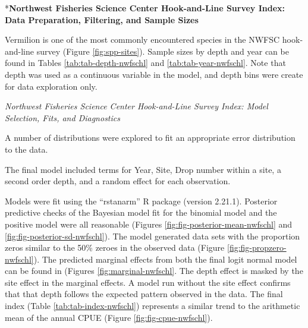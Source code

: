 \documentclass[
  english,
  a4paper,
]{article}
\begin{document}
*\textbf{Northwest Fisheries Science Center Hook-and-Line Survey Index: Data Preparation, Filtering, and Sample Sizes}

Vermilion is one of the most commonly encountered species in the NWFSC hook-and-line survey (Figure \ref{fig:spp-sites}). Sample sizes by depth and year can be found in Tables
\ref{tab:tab-depth-nwfschl} and \ref{tab:tab-year-nwfschl}.
Note that depth was used as a continuous variable in the model, and depth bins were create for data exploration only.

\emph{Northwest Fisheries Science Center Hook-and-Line Survey Index: Model Selection, Fits, and Diagnostics}

A number of distributions were explored to fit an appropriate error distribution to
the data.

The final model included terms for Year, Site, Drop number within a site, a
second order depth, and a random effect for each observation.

Models were fit using the ``rstanarm'' R package (version 2.21.1). Posterior predictive
checks of the Bayesian model fit for the binomial model and the positive model
were all reasonable (Figures \ref{fig:fig-posterior-mean-nwfschl} and
\ref{fig:fig-posterior-sd-nwfschl}). The model generated data sets with the
proportion zeros similar to the 50\% zeroes in the observed data
(Figure \ref{fig:fig-propzero-nwfschl}). The predicted marginal effects from
both the final logit normal model can be found in (Figures \ref{fig:marginal-nwfschl}.
The depth effect is masked by the site effect in the marginal effects. A model
run without the site effect confirms that that depth follows the expected pattern
observed in the data.
The final index (Table \ref{tab:tab-index-nwfschl})
represents a similar trend to the arithmetic mean of the annual CPUE (Figure \ref{fig:fig-cpue-nwfschl}).

\newpage
\end{document}
